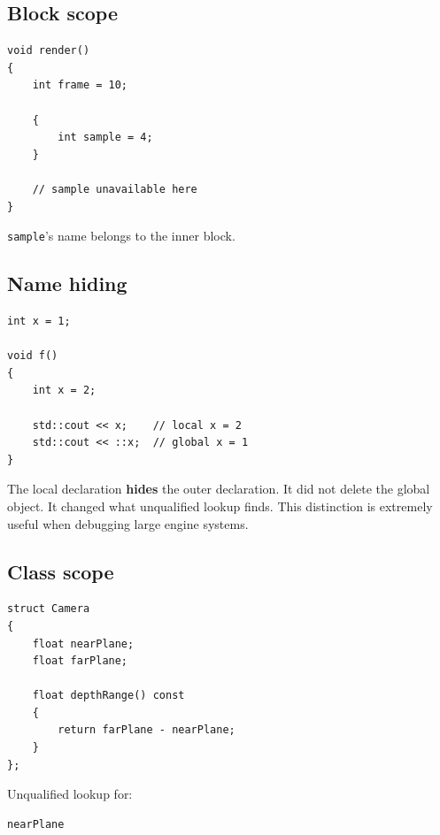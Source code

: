 \subsection{Block scope}\label{05-engine-i-ch002-block-scope}

\hypertarget{05-engine-i-ch002-block-scope}{}

\begin{verbatim}
void render()
{
    int frame = 10;

    {
        int sample = 4;
    }

    // sample unavailable here
}
\end{verbatim}

\texttt{sample}'s name belongs to the inner block.

\subsection{Name hiding}\label{05-engine-i-ch002-name-hiding}

\hypertarget{05-engine-i-ch002-name-hiding}{}

\begin{verbatim}
int x = 1;

void f()
{
    int x = 2;

    std::cout << x;    // local x = 2
    std::cout << ::x;  // global x = 1
}
\end{verbatim}

The local declaration \textbf{hides} the outer declaration. It did not delete the global object. It changed what unqualified lookup finds. This distinction is extremely useful when debugging large engine systems.

\subsection{Class scope}\label{05-engine-i-ch002-class-scope}

\hypertarget{05-engine-i-ch002-class-scope}{}

\begin{verbatim}
struct Camera
{
    float nearPlane;
    float farPlane;

    float depthRange() const
    {
        return farPlane - nearPlane;
    }
};
\end{verbatim}

Unqualified lookup for:

\begin{verbatim}
nearPlane
\end{verbatim}

